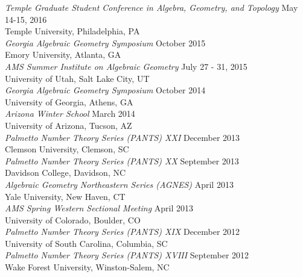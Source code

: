 \documentclass{article}
\begin{document}
\noindent\textsl{Temple Graduate Student Conference in Algebra, Geometry, and Topology} \hfill May 14-15, 2016\\
Temple University, Philadelphia, PA\\

\noindent\textsl{Georgia Algebraic Geometry Symposium} \hfill October 2015\\
Emory University, Atlanta, GA\\

\noindent\textsl{AMS Summer Institute on Algebraic Geometry} \hfill July 27 - 31, 2015\\
University of Utah, Salt Lake City, UT\\

\noindent\textsl{Georgia Algebraic Geometry Symposium} \hfill October 2014\\
University of Georgia, Athens, GA\\

\noindent\textsl{Arizona Winter School} \hfill March 2014\\
University of Arizona, Tucson, AZ\\

\noindent\textsl{Palmetto Number Theory Series (PANTS) XXI} \hfill December 2013\\
Clemson University, Clemson, SC\\

\noindent\textsl{Palmetto Number Theory Series (PANTS) XX} \hfill September 2013\\
Davidson College, Davidson, NC\\

\noindent\textsl{Algebraic Geometry Northeastern Series (AGNES)} \hfill April 2013\\
Yale University, New Haven, CT\\

\noindent\textsl{AMS Spring Western Sectional Meeting} \hfill April 2013\\
University of Colorado, Boulder, CO\\

\noindent\textsl{Palmetto Number Theory Series (PANTS) XIX} \hfill December 2012\\
University of South Carolina, Columbia, SC\\

\noindent\textsl{Palmetto Number Theory Series (PANTS) XVIII} \hfill September 2012\\
Wake Forest University, Winston-Salem, NC
\end{document}
